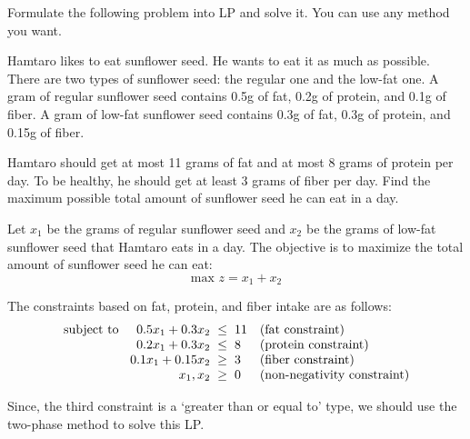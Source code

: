 \documentclass[a4paper, 10pt]{article}
\begin{document}
\begin{tosubmit}
\problem[4] Formulate the following problem into LP and solve it.
You can use any method you want.

\vspace{3mm}

Hamtaro likes to eat sunflower seed. He wants to eat it as much as possible. There are two
types of sunflower seed: the regular one and the low-fat one. A gram of regular sunflower
seed contains 0.5g of fat, 0.2g of protein, and 0.1g of fiber. A gram of low-fat sunflower seed
contains 0.3g of fat, 0.3g of protein, and 0.15g of fiber.

\vspace{3mm}

Hamtaro should get at most 11 grams of fat and at most 8 grams of protein per day. To be
healthy, he should get at least 3 grams of fiber per day. Find the maximum possible total
amount of sunflower seed he can eat in a day.

\vspace{3mm}

\par\noindent\submitsolution
Let \( x_1 \) be the grams of regular sunflower seed and \( x_2 \) be the grams of low-fat sunflower seed that Hamtaro eats in a day.
The objective is to maximize the total amount of sunflower seed he can eat:
\[ \text{max } z = x_1 + x_2 \]

The constraints based on fat, protein, and fiber intake are as follows:
\[
\begin{array}{@{\hspace{2mm}} r @{\hspace{2mm}} r @{\hspace{2mm}} c @{\hspace{2mm}} ll}
    \text{subject to } & 0.5x_1 + 0.3x_2 & \leq & 11 & \text{(fat constraint)} \\
    & 0.2x_1 + 0.3x_2 & \leq & 8 & \text{(protein constraint)} \\
    & 0.1x_1 + 0.15x_2 & \geq & 3 & \text{(fiber constraint)} \\
    & x_1, x_2 & \geq & 0 & \text{(non-negativity constraint)}
\end{array}
\]

Since, the third constraint is a `greater than or equal to' type, we should use the two-phase method to solve this LP.

\vspace{3mm}


\end{tosubmit}
\end{document}
